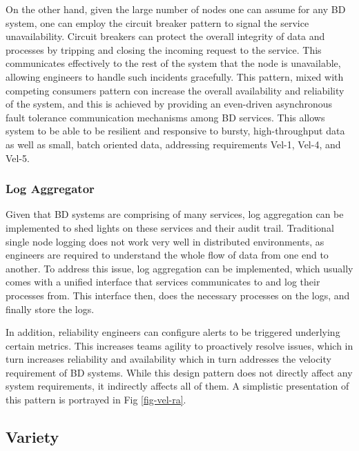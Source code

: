 \documentclass{bmcart}
\begin{document}
On the other hand, given the large number of nodes one can assume for any BD system, one can employ the circuit breaker pattern to signal the service unavailability. Circuit breakers can protect the overall integrity of data and processes by tripping and closing the incoming request to the service. This communicates effectively to the rest of the system that the node is unavailable, allowing engineers to handle such incidents gracefully. This pattern, mixed with competing consumers pattern con increase the overall availability and reliability of the system, and this is achieved by providing an even-driven asynchronous fault tolerance communication mechanisms among BD services. This allows system to be able to be resilient and responsive to bursty, high-throughput data as well as small, batch oriented data, addressing requirements Vel-1, Vel-4, and Vel-5. 
    
\subsubsection{Log Aggregator}

Given that BD systems are comprising of many services, log aggregation can be implemented to shed lights on these services and their audit trail. Traditional single node logging does not work very well in distributed environments, as engineers are required to understand the whole flow of data from one end to another. To address this issue, log aggregation can be implemented, which usually comes with a unified interface that services communicates to and log their processes from. This interface then, does the necessary processes on the logs, and finally store the logs. 

In addition, reliability engineers can configure alerts to be triggered underlying certain metrics. This increases teams agility to proactively resolve issues, which in turn increases reliability and availability which in turn addresses the velocity requirement of BD systems. While this design pattern does not directly affect any system requirements, it indirectly affects all of them. A simplistic presentation of this pattern is portrayed in Fig \ref{fig-vel-ra}. 



\subsection{Variety}
\end{document}
